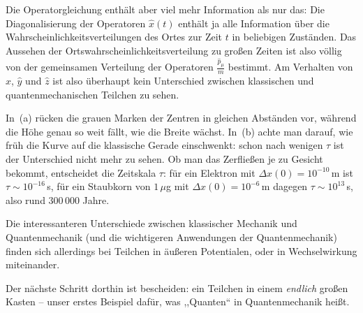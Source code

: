 Die Operatorgleichung enthält aber viel mehr Information als nur das: Die Diagonalisierung der Operatoren $\widehat{x}(t)$ enthält ja alle Information über die Wahrscheinlichkeitsverteilungen des Ortes zur Zeit $t$ in beliebigen Zuständen. Das Aussehen der Ortswahrscheinlichkeitsverteilung zu großen Zeiten ist also völlig von der gemeinsamen Verteilung der Operatoren $\frac{\widehat{p}_\mu}{m}$ bestimmt. Am Verhalten von $\widehat{x}$, $\widehat{y}$ und $\widehat{z}$  ist also überhaupt kein Unterschied zwischen klassischen und quantenmechanischen Teilchen zu sehen.



In~(a) rücken die grauen Marken der Zentren in gleichen Abständen vor, während
die Höhe genau so weit fällt, wie die Breite wächst. In~(b) achte man darauf,
wie früh die Kurve auf die klassische Gerade einschwenkt: schon nach wenigen
$\tau$ ist der Unterschied nicht mehr zu sehen. Ob man das Zerfließen je zu
Gesicht bekommt, entscheidet die Zeitskala $\tau$: für ein Elektron mit
$\Delta x(0) = 10^{-10}$\,m ist $\tau \sim 10^{-16}$\,s, für ein Staubkorn von
$1\,\mu$g mit $\Delta x(0) = 10^{-6}$\,m dagegen $\tau \sim 10^{13}$\,s, also
rund $300\,000$ Jahre.

Die interessanteren Unterschiede zwischen klassischer Mechanik und Quantenmechanik (und die wichtigeren Anwendungen der Quantenmechanik) finden sich allerdings bei Teilchen in äußeren Potentialen, oder in Wechselwirkung miteinander.

Der nächste Schritt dorthin ist bescheiden: ein Teilchen in einem \emph{endlich} großen Kasten -- unser erstes Beispiel dafür, was ,,Quanten`` in Quantenmechanik heißt.